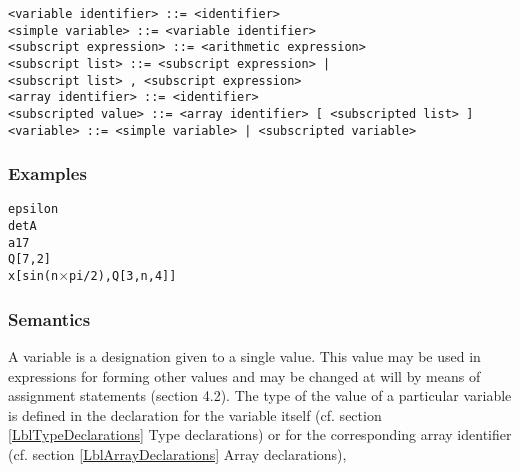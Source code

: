\documentclass[a4paper,11pt]{article}
\begin{document}
\begin{flushleft}
\vspace{0.2em}\texttt{<variable identifier> ::= <identifier>}\\

\vspace{0.2em}\texttt{<simple variable> ::= <variable identifier>}\\

\vspace{0.2em}\texttt{<subscript expression> ::= <arithmetic expression>}\\

\vspace{0.2em}\texttt{<subscript list> ::= <subscript expression> |\\
  \hspace{1.0cm}<subscript list> , <subscript expression>}\\

\vspace{0.2em}\texttt{<array identifier> ::= <identifier>}\\

\vspace{0.2em}\texttt{<subscripted value> ::= <array identifier> [ <subscripted list> ]}\\

\vspace{0.2em}\texttt{<variable> ::= <simple variable> | <subscripted variable>}\\
\end{flushleft}


\subsubsection{Examples}

\begin{flushleft}
\texttt{epsilon\\
detA\\
a17\\
Q[7,2]\\
x[sin(n$\times$pi/2),Q[3,n,4]]\\
}\end{flushleft}


\subsubsection{Semantics}
\label{LblVariablesSemantics}

A variable is a designation given to a single value.  This value may
be used in expressions for forming other values and may be changed at
will by means of assignment statements (section 4.2).  The type of the
value of a particular variable is defined in the declaration for the
variable itself (cf. section \ref{LblTypeDeclarations} Type
declarations) or for the corresponding array identifier (cf. section
\ref{LblArrayDeclarations} Array declarations),
\end{document}
